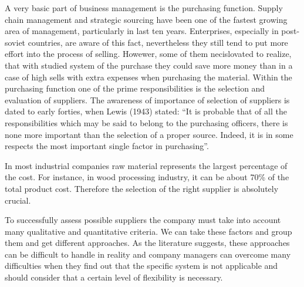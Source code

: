 \documentclass[oneside,12pt]{article}%
\begin{document}
\obsah
{}
\setcounter{page}{7}

A very basic part of business management is the purchasing function. Supply chain management and strategic sourcing have been one of the fastest growing area of management, particularly in last ten years. Enterprises, especially in post-soviet countries, are aware of this fact, nevertheless they still tend to put more effort into the process of selling. Howewer, some of them necislovated to realize, that with studied system of the purchase they could save more money than in a case of high sells with extra expenses when purchasing the material. Within the purchasing function one of the prime responsibilities is the selection and evaluation of suppliers. The awareness of importance of selection of suppliers is dated to early forties, when Lewis (1943) stated: “It is probable that of all the responsibilities which may be said to belong to the purchasing officers, there is none more important than the selection of a proper source. Indeed, it is in some respects the most important single factor in purchasing”. \par
In most industrial companies raw material represents the largest percentage of the cost. For instance, in wood processing industry, it can be about 70\% of the total product cost. Therefore the selection of the right supplier is absolutely crucial.\par
To successfully assess possible suppliers the company must take into account many qualitative and quantitative criteria. We can take these factors and group them and get different approaches. As the literature suggests, these approaches can be difficult to handle in reality and company managers can overcome many difficulties when they find out that the specific system is not applicable and should consider that a certain level of flexibility is necessary. \cite{lewis}
\end{document}

